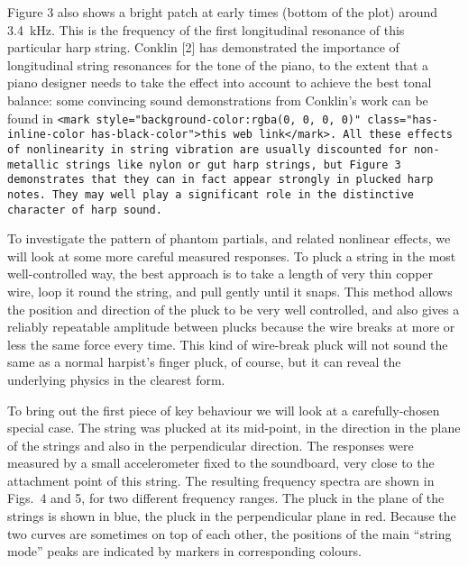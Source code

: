   Figure 3 also shows a bright patch at early times (bottom of the plot) around 
  3.4 kHz. This is the frequency of the first longitudinal resonance of this 
  particular harp string. Conklin [2] has demonstrated the importance of 
  longitudinal string resonances for the tone of the piano, to the extent that 
  a piano designer needs to take the effect into account to achieve the best 
  tonal balance: some convincing sound demonstrations from Conklin's work can 
  be found in \tt{}<mark style="background-color:rgba(0, 0, 0, 0)" 
  class="has-inline-color has-black-color">this web link</mark>\rm{}. All these 
  effects of nonlinearity in string vibration are usually discounted for 
  non-metallic strings like nylon or gut harp strings, but Figure 3 
  demonstrates that they can in fact appear strongly in plucked harp notes. 
  They may well play a significant role in the distinctive character of harp 
  sound. 

  To investigate the pattern of phantom partials, and related nonlinear 
  effects, we will look at some more careful measured responses. To pluck a 
  string in the most well-controlled way, the best approach is to take a length 
  of very thin copper wire, loop it round the string, and pull gently until it 
  snaps. This method allows the position and direction of the pluck to be very 
  well controlled, and also gives a reliably repeatable amplitude between 
  plucks because the wire breaks at more or less the same force every time. 
  This kind of wire-break pluck will not sound the same as a normal harpist’s 
  finger pluck, of course, but it can reveal the underlying physics in the 
  clearest form. 

  To bring out the first piece of key behaviour we will look at a 
  carefully-chosen special case. The string was plucked at its mid-point, in 
  the direction in the plane of the strings and also in the perpendicular 
  direction. The responses were measured by a small accelerometer fixed to the 
  soundboard, very close to the attachment point of this string. The resulting 
  frequency spectra are shown in Figs.\ 4 and 5, for two different frequency 
  ranges. The pluck in the plane of the strings is shown in blue, the pluck in 
  the perpendicular plane in red. Because the two curves are sometimes on top 
  of each other, the positions of the main “string mode” peaks are indicated by 
  markers in corresponding colours. 


